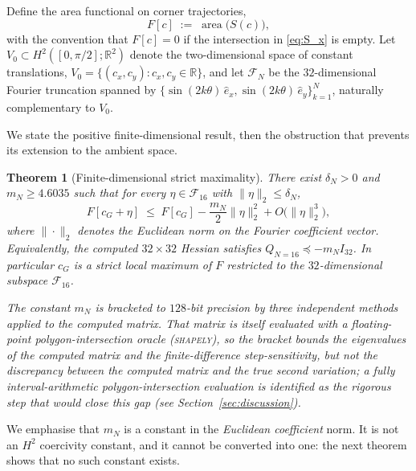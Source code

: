 \documentclass[11pt]{amsart}
\theoremstyle{plain}
\newtheorem{theorem}{Theorem}
\theoremstyle{definition}
\newcommand{\R}{\mathbb{R}}
\newcommand{\cG}{c_{G}}
\DeclareMathOperator{\area}{area}
\begin{document}
Define the area functional on corner trajectories,
\begin{equation}\label{eq:F}
  F[c] \;:=\; \area\bigl( S(c) \bigr),
\end{equation}
with the convention that $F[c] = 0$ if the intersection in
\eqref{eq:S_x} is empty.  Let $V_{0} \subset H^{2}([0, \pi/2]; \R^{2})$
denote the two-dimensional space of constant translations,
$V_{0} = \{(c_x, c_y) : c_x, c_y \in \R\}$, and let
$\mathcal{F}_{N}$ be the $32$-dimensional Fourier truncation
spanned by $\{\sin(2k\theta) \, \hat{e}_x, \sin(2k\theta) \, \hat{e}_y\}_{k=1}^{N}$,
naturally complementary to $V_{0}$.

We state the positive finite-dimensional result, then the
obstruction that prevents its extension to the ambient space.

\begin{theorem}[Finite-dimensional strict maximality]\label{thm:truncated}
There exist $\delta_{N} > 0$ and $m_{N} \geq 4.6035$ such that for
every $\eta \in \mathcal{F}_{16}$ with $\|\eta\|_{2} \leq \delta_{N}$,
\begin{equation}\label{eq:truncated}
  F[\cG + \eta] \;\leq\; F[\cG] - \frac{m_{N}}{2} \|\eta\|_{2}^{2}
                + O\bigl(\|\eta\|_{2}^{3}\bigr),
\end{equation}
where $\|\cdot\|_{2}$ denotes the Euclidean norm on the Fourier
coefficient vector.  Equivalently, the computed $32\times32$ Hessian
satisfies $Q_{N=16} \preceq -m_{N} I_{32}$.  In particular $\cG$ is a
strict local maximum of $F$ restricted to the $32$-dimensional
subspace $\mathcal{F}_{16}$.

The constant $m_{N}$ is bracketed to $128$-bit precision by three
independent methods applied to the \emph{computed} matrix.  That
matrix is itself evaluated with a floating-point polygon-intersection
oracle (\textsc{shapely}), so the bracket bounds the eigenvalues of
the computed matrix and the finite-difference step-sensitivity, but
not the discrepancy between the computed matrix and the true second
variation; a fully interval-arithmetic polygon-intersection evaluation
is identified as the rigorous step that would close this gap (see
Section~\ref{sec:discussion}).
\end{theorem}

We emphasise that $m_{N}$ is a constant in the \emph{Euclidean
coefficient} norm.  It is not an $H^{2}$ coercivity constant, and it
cannot be converted into one: the next theorem shows that no such
constant exists.
\end{document}
